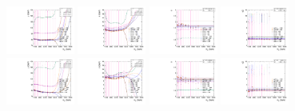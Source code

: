 \begin{figure}[htbp]
  \includegraphics[width=0.2\textwidth]{fig/analysisAppendix/paramSignalShape_allSig_MJJ_HP_nobb_HDy_mean.pdf}
  \includegraphics[width=0.2\textwidth]{fig/analysisAppendix/paramSignalShape_allSig_MJJ_HP_nobb_HDy_sigma.pdf}
  \includegraphics[width=0.2\textwidth]{fig/analysisAppendix/paramSignalShape_allSig_MJJ_HP_nobb_HDy_alpha.pdf}
  \includegraphics[width=0.2\textwidth]{fig/analysisAppendix/paramSignalShape_allSig_MJJ_HP_nobb_HDy_alpha2.pdf}\\
  \includegraphics[width=0.2\textwidth]{fig/analysisAppendix/paramSignalShape_allSig_MJJ_LP_nobb_HDy_mean.pdf}
  \includegraphics[width=0.2\textwidth]{fig/analysisAppendix/paramSignalShape_allSig_MJJ_LP_nobb_HDy_sigma.pdf}
  \includegraphics[width=0.2\textwidth]{fig/analysisAppendix/paramSignalShape_allSig_MJJ_LP_nobb_HDy_alpha.pdf}
  \includegraphics[width=0.2\textwidth]{fig/analysisAppendix/paramSignalShape_allSig_MJJ_LP_nobb_HDy_alpha2.pdf}\\

\end{figure}
